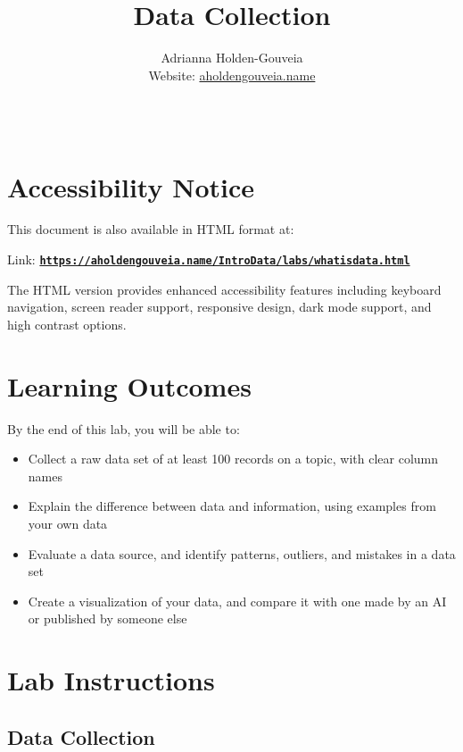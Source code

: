 \documentclass[12pt]{article}
\title{Data Collection}
\author{
        Adrianna Holden-Gouveia \\
        Website: \href{https://aholdengouveia.name}{aholdengouveia.name}\\
        \date{\vspace{-5ex}}
        \faGithub {: aholdengouveia} \\
        }
\begin{document}
    

\maketitle



\section*{Accessibility Notice}
This document is also available in HTML format at:

Link: \href{https://aholdengouveia.name/IntroData/labs/whatisdata.html}{\textbf{\nolinkurl{https://aholdengouveia.name/IntroData/labs/whatisdata.html}}}

The HTML version provides enhanced accessibility features including keyboard navigation, screen reader support, responsive design, dark mode support, and high contrast options.

\section*{Learning Outcomes}
By the end of this lab, you will be able to:
\begin{itemize}
    \item Collect a raw data set of at least 100 records on a topic, with clear column names
    \item Explain the difference between data and information, using examples from your own data
    \item Evaluate a data source, and identify patterns, outliers, and mistakes in a data set
    \item Create a visualization of your data, and compare it with one made by an AI or published by someone else
\end{itemize}

\section*{Lab Instructions}

\subsection*{Data Collection}
\end{document}
